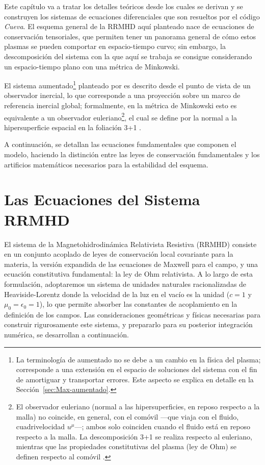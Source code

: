 \primerparrafo Este capítulo va a tratar los detalles teóricos desde los cuales se derivan y se construyen los sistemas de ecuaciones diferenciales que son resueltos por el código \textit{Cueva}. El esquema general de la RRMHD aquí planteado nace de ecuaciones de conservación tensoriales, que permiten tener un panorama general de cómo estos plasmas se pueden comportar en espacio-tiempo curvo; sin embargo, la descomposición del sistema con la que aquí se trabaja se consigue considerando un espacio-tiempo plano con una métrica de Minkowski.

El sistema aumentado\footnote{La terminología de aumentado no se debe a un cambio en la física del plasma; corresponde a una extensión en el espacio de soluciones del sistema con el fin de amortiguar y transportar errores. Este aspecto se explica en detalle en la Sección~\ref{sec:Max-aumentado}.} planteado por \textcite{komissarov-2007} es descrito desde el punto de vista de un observador inercial, lo que corresponde a una proyección sobre un marco de referencia inercial global; formalmente, en la métrica de Minkowski esto es equivalente a un observador euleriano\footnote{El observador euleriano (normal a las hipersuperficies, en reposo respecto a la malla) no coincide, en general, con el comóvil ---que viaja con el fluido, cuadrivelocidad $u^\mu$---; ambos solo coinciden cuando el fluido está en reposo respecto a la malla. La descomposición 3+1 se realiza respecto al euleriano, mientras que las propiedades constitutivas del plasma (ley de Ohm) se definen respecto al comóvil \parencite{rezzolla-2013}.}, el cual se define por la normal a la hipersuperficie espacial en la foliación 3+1 \parencite{rezzolla-2013}.

A continuación, se detallan las ecuaciones fundamentales que componen el modelo, haciendo la distinción entre las leyes de conservación fundamentales y los artificios matemáticos necesarios para la estabilidad del esquema.

\section{Las Ecuaciones del Sistema RRMHD}

\primerparrafo El sistema de la Magnetohidrodinámica Relativista Resistiva (RRMHD) consiste en un conjunto acoplado de leyes de conservación local covariante para la materia, la versión expandida de las ecuaciones de Maxwell para el campo, y una ecuación constitutiva fundamental: la ley de Ohm relativista. A lo largo de esta formulación, adoptaremos un sistema de unidades naturales racionalizadas de Heaviside-Lorentz donde la velocidad de la luz en el vacío es la unidad ($c=1$ y $\mu_0 = \epsilon_0 = 1$), lo que permite absorber las constantes de acoplamiento en la definición de los campos. Las consideraciones geométricas y físicas necesarias para construir rigurosamente este sistema, y prepararlo para su posterior integración numérica, se desarrollan a continuación.

